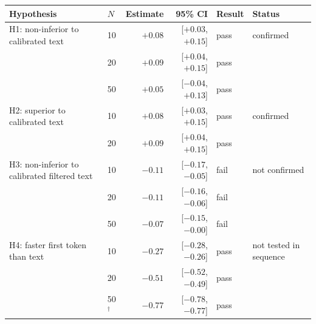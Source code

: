 \begin{tabular}{llrrll}
\toprule
Hypothesis & $N$ & Estimate & 95\% CI & Result & Status \\
\midrule
H1: non-inferior to calibrated text & 10 & $+0.08$ & [$+0.03$, $+0.15$] & pass & confirmed \\
 & 20 & $+0.09$ & [$+0.04$, $+0.15$] & pass &  \\
 & 50 & $+0.05$ & [$-0.04$, $+0.13$] & pass &  \\
H2: superior to calibrated text & 10 & $+0.08$ & [$+0.03$, $+0.15$] & pass & confirmed \\
 & 20 & $+0.09$ & [$+0.04$, $+0.15$] & pass &  \\
H3: non-inferior to calibrated filtered text & 10 & $-0.11$ & [$-0.17$, $-0.05$] & fail & not confirmed \\
 & 20 & $-0.11$ & [$-0.16$, $-0.06$] & fail &  \\
 & 50 & $-0.07$ & [$-0.15$, $-0.00$] & fail &  \\
H4: faster first token than text & 10 & $-0.27$ & [$-0.28$, $-0.26$] & pass & not tested in sequence \\
 & 20 & $-0.51$ & [$-0.52$, $-0.49$] & pass &  \\
 & 50$^\dagger$ & $-0.77$ & [$-0.78$, $-0.77$] & pass &  \\
\bottomrule
\end{tabular}
